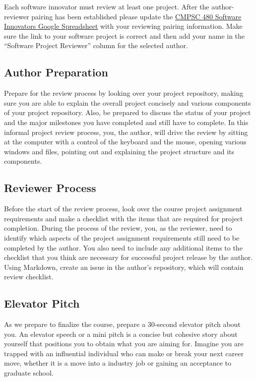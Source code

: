\documentclass[11pt]{article}
\begin{document}
Each software innovator must review at least one project. After the author-reviewer pairing has been established please update the \href{https://docs.google.com/spreadsheets/d/1p5N6JGmYllYSUAc4E1CcibHz30lQqyM_ZC1RfTphdEI/edit?usp=sharing}{CMPSC 480 Software Innovators Google Spreadsheet} with your reviewing pairing information. Make sure the link to your software project is correct and then add your name in the ``Software Project Reviewer'' column for the selected author. 


\subsection*{Author Preparation}
Prepare for the review process by looking over your project repository, making sure you are able to explain the overall project concisely and various components of your project repository. Also, be prepared to discuss the status of your project and the major milestones you have completed and still have to complete. In this informal project review process, you, the author, will drive the review by sitting at the computer with a control of the keyboard and the mouse, opening various windows and files, pointing out and explaining the project structure and its components.

\newpage

\subsection*{Reviewer Process}
Before the start of the review process, look over the course project assignment requirements and make a checklist with the items that are required for project completion.
During the process of the review, you, as the reviewer, need to identify which aspects of the project assignment requirements still need to be completed by the author. You also need to include any additional items to the checklist that you think are necessary for successful project release by the author. Using Markdown, create an issue in the author's repository, which will contain review checklist. 

\subsection*{Elevator Pitch}
As we prepare to finalize the course, prepare a 30-second elevator pitch about you. An elevator speech or a mini pitch is  a concise but cohesive  story about yourself that positions you to obtain what you are aiming for. Imagine you are trapped with an influential individual who can make or break your next career move, whether it is a move into a industry job or gaining an acceptance to graduate school. 
\end{document}
